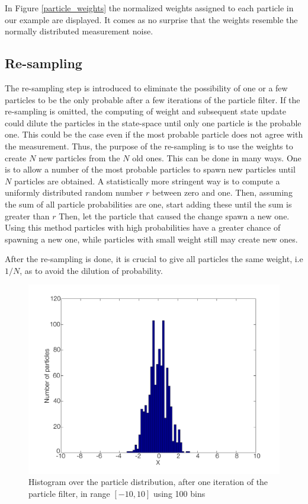 \documentclass{LTHthesis}
\begin{document}
In Figure \ref{particle_weights} the normalized weights assigned to each particle in our example are displayed. It comes as no surprise that the weights resemble the normally distributed measurement noise. 
%
\subsection{Re-sampling}
%
The re-sampling step is introduced to eliminate the possibility of one or a few particles to be the only probable after a few iterations of the particle filter. If the re-sampling is omitted, the computing of weight and subsequent state update could dilute the particles in the state-space until only one particle is the probable one. This could be the case even if the most probable particle does not agree with the measurement. Thus, the purpose of the re-sampling is to use the weights to create $N$ new particles from the $N$ old ones. This can be done in many ways. One is to allow a number of the most probable particles to spawn new particles until $N$ particles are obtained. A statistically more stringent way is to compute a uniformly distributed random number $r$ between zero and one. Then, assuming the sum of all particle probabilities are one, start adding these until the sum is greater than $r$ Then, let the particle that caused the change spawn a new one. Using this method particles with high probabilities have a greater chance of spawning a new one, while particles with small weight still may create new ones.

After the re-sampling is done, it is crucial to give all particles the same weight, i.e $1/N$, as to avoid the dilution of probability.
%
\begin{figure}[!hbt]

\includegraphics[width=1\textwidth ]{images/PF/hist_dist_1_itr}
\caption{Histogram over the particle distribution, after one iteration of the particle filter, in range $[-10,10]$ using 100 bins}\label{hist_dist_1_itr}
\end{figure}
\end{document}
